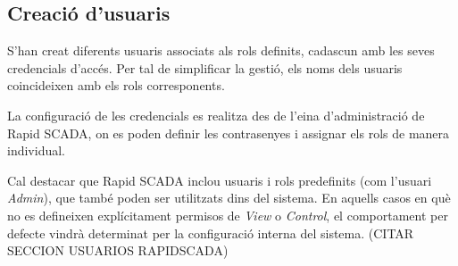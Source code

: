 \documentclass[12pt,a4paper]{report}
\begin{document}
\subsection{Creació d'usuaris}

S'han creat diferents usuaris associats als rols definits, cadascun amb les seves credencials d'accés. Per tal de simplificar la gestió, els noms dels usuaris coincideixen amb els rols corresponents.

La configuració de les credencials es realitza des de l'eina d'administració de Rapid SCADA, on es poden definir les contrasenyes i assignar els rols de manera individual.

Cal destacar que Rapid SCADA inclou usuaris i rols predefinits (com l'usuari \textit{Admin}), que també poden ser utilitzats dins del sistema. En aquells casos en què no es defineixen explícitament permisos de \textit{View} o \textit{Control}, el comportament per defecte vindrà determinat per la configuració interna del sistema. (CITAR SECCION USUARIOS RAPIDSCADA)
\end{document}

